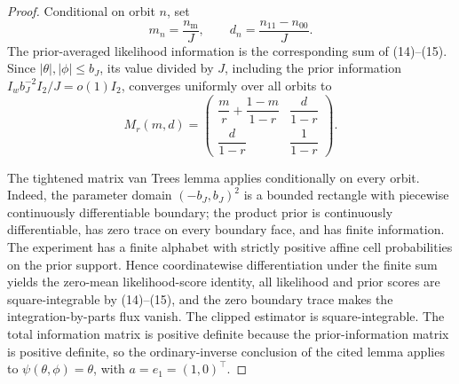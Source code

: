 \documentclass{article}
\begin{document}
\begin{proof}
Conditional on orbit \(n\), set
\[
 m_n=\frac{n_{\mathrm m}}J,
 \qquad
 d_n=\frac{n_{11}-n_{00}}J.
\]
The prior-averaged likelihood information is the corresponding sum of (14)--(15).  Since \(|\theta|,|\phi|\le b_J\), its value divided by \(J\), including the prior information \(I_w b_J^{-2}I_2/J=o(1)I_2\), converges uniformly over all orbits to
\[
 M_r(m,d)=
 \begin{pmatrix}
 \dfrac m r+\dfrac{1-m}{1-r}&\dfrac d{1-r}\\[6pt]
 \dfrac d{1-r}&\dfrac1{1-r}
 \end{pmatrix}.
 \tag{16}
\]

The tightened matrix van Trees lemma applies conditionally on every orbit.  Indeed, the parameter domain \((-b_J,b_J)^2\) is a bounded rectangle with piecewise continuously differentiable boundary; the product prior is continuously differentiable, has zero trace on every boundary face, and has finite information.  The experiment has a finite alphabet with strictly positive affine cell probabilities on the prior support.  Hence coordinatewise differentiation under the finite sum yields the zero-mean likelihood-score identity, all likelihood and prior scores are square-integrable by (14)--(15), and the zero boundary trace makes the integration-by-parts flux vanish.  The clipped estimator is square-integrable.  The total information matrix is positive definite because the prior-information matrix is positive definite, so the ordinary-inverse conclusion of the cited lemma applies to \(\psi(\theta,\phi)=\theta\), with \(a=e_1=(1,0)^{\!\top}\).


\end{proof}
\end{document}
